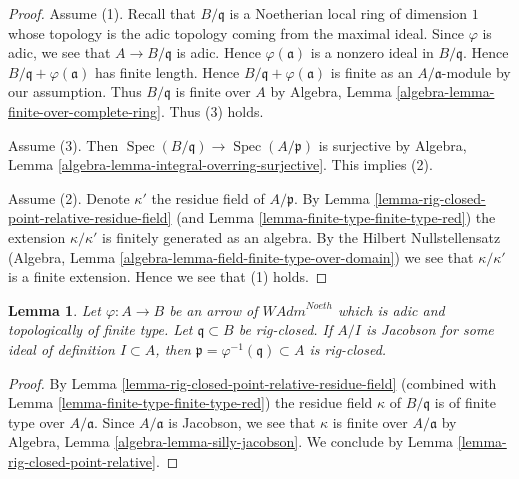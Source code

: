 \documentclass{stacks-project}
\theoremstyle{plain}
\newtheorem{lemma}[subsection]{Lemma}
\theoremstyle{definition}
\theoremstyle{remark}
\numberwithin{equation}{subsection}
\def\Spec{\mathop{\mathrm{Spec}}}
\begin{document}
\begin{proof}
Assume (1). Recall that $B/\mathfrak q$ is a Noetherian local ring
of dimension $1$ whose topology is the adic topology coming
from the maximal ideal. Since $\varphi$ is adic, we see that
$A \to B/\mathfrak q$ is adic. Hence $\varphi(\mathfrak a)$
is a nonzero ideal in $B/\mathfrak q$. Hence
$B/\mathfrak q + \varphi(\mathfrak a)$
has finite length. Hence $B/\mathfrak q + \varphi(\mathfrak a)$
is finite as an $A/\mathfrak a$-module by our assumption.
Thus $B/\mathfrak q$ is finite over $A$ by
Algebra, Lemma \ref{algebra-lemma-finite-over-complete-ring}.
Thus (3) holds.

\medskip\noindent
Assume (3). Then $\Spec(B/\mathfrak q) \to \Spec(A/\mathfrak p)$
is surjective by
Algebra, Lemma \ref{algebra-lemma-integral-overring-surjective}.
This implies (2).

\medskip\noindent
Assume (2). Denote $\kappa'$ the residue field of $A/\mathfrak p$.
By Lemma \ref{lemma-rig-closed-point-relative-residue-field}
(and Lemma \ref{lemma-finite-type-finite-type-red})
the extension $\kappa/\kappa'$ is finitely generated as an algebra.
By the Hilbert Nullstellensatz (Algebra, Lemma
\ref{algebra-lemma-field-finite-type-over-domain})
we see that $\kappa/\kappa'$ is a finite extension.
Hence we see that (1) holds.
\end{proof}

\begin{lemma}
\label{lemma-rig-closed-jacobson}
Let $\varphi : A \to B$ be an arrow of $\textit{WAdm}^{Noeth}$
which is adic and topologically of finite type.
Let $\mathfrak q \subset B$ be rig-closed.
If $A/I$ is Jacobson for some ideal of definition $I \subset A$, then
$\mathfrak p = \varphi^{-1}(\mathfrak q) \subset A$
is rig-closed.
\end{lemma}

\begin{proof}
By Lemma \ref{lemma-rig-closed-point-relative-residue-field}
(combined with Lemma \ref{lemma-finite-type-finite-type-red})
the residue field $\kappa$ of $B/\mathfrak q$ is of finite type over
$A/\mathfrak a$. Since $A/\mathfrak a$ is Jacobson, we
see that $\kappa$ is finite over $A/\mathfrak a$ by
Algebra, Lemma \ref{algebra-lemma-silly-jacobson}.
We conclude by Lemma \ref{lemma-rig-closed-point-relative}.
\end{proof}
\end{document}
